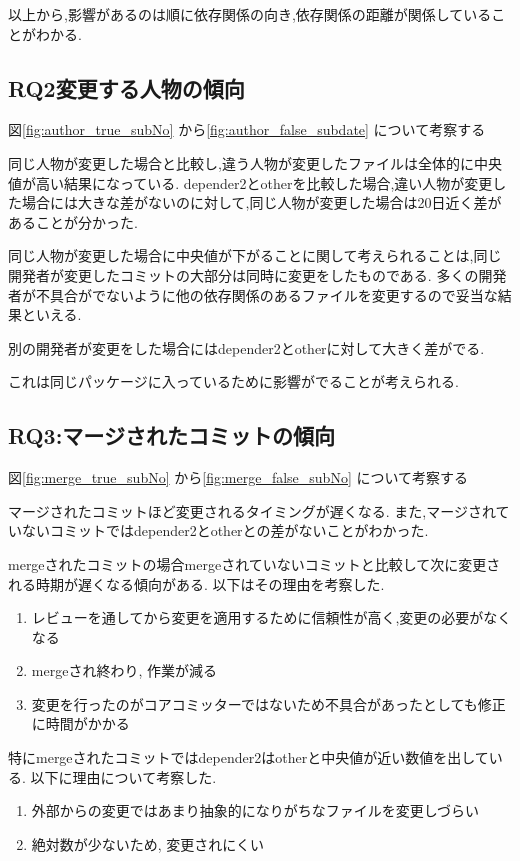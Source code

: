 \documentclass[submit,ses,noauthor]{ipsj} %
\begin{document}
以上から,影響があるのは順に依存関係の向き,依存関係の距離が関係していることがわかる.



\subsection{RQ2変更する人物の傾向}
図\ref{fig:author_true_subNo} から\ref{fig:author_false_subdate} について考察する

同じ人物が変更した場合と比較し,違う人物が変更したファイルは全体的に中央値が高い結果になっている.
depender2とotherを比較した場合,違い人物が変更した場合には大きな差がないのに対して,同じ人物が変更した場合は20日近く差があることが分かった.

同じ人物が変更した場合に中央値が下がることに関して考えられることは,同じ開発者が変更したコミットの大部分は同時に変更をしたものである.
多くの開発者が不具合がでないように他の依存関係のあるファイルを変更するので妥当な結果といえる.

別の開発者が変更をした場合にはdepender2とotherに対して大きく差がでる.

これは同じパッケージに入っているために影響がでることが考えられる.


\subsection{RQ3:マージされたコミットの傾向}
図\ref{fig:merge_true_subNo} から\ref{fig:merge_false_subNo} について考察する

マージされたコミットほど変更されるタイミングが遅くなる.
また,マージされていないコミットではdepender2とotherとの差がないことがわかった.


mergeされたコミットの場合mergeされていないコミットと比較して次に変更される時期が遅くなる傾向がある.
以下はその理由を考察した.
\begin{enumerate}
\item レビューを通してから変更を適用するために信頼性が高く,変更の必要がなくなる
\item mergeされ終わり, 作業が減る
\item 変更を行ったのがコアコミッターではないため不具合があったとしても修正に時間がかかる
\end{enumerate}

特にmergeされたコミットではdepender2はotherと中央値が近い数値を出している.
以下に理由について考察した.

\begin{enumerate}
\item 外部からの変更ではあまり抽象的になりがちなファイルを変更しづらい
\item 絶対数が少ないため, 変更されにくい
\end{enumerate}
\end{document}
